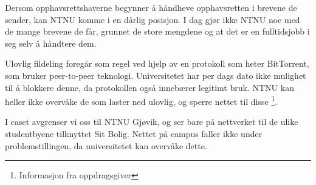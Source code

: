 Dersom opphavsrettshaverne begynner å håndheve opphavsretten i brevene de sender, kan NTNU komme i en dårlig posisjon. I dag gjør ikke NTNU noe med de mange brevene de får, grunnet de store mengdene og at det er en fulltidsjobb i seg selv å håndtere dem.

Ulovlig fildeling foregår som regel ved hjelp av en protokoll som heter BitTorrent, som bruker peer-to-peer teknologi. Universitetet har per dags dato ikke mulighet til å blokkere denne, da protokollen også innebærer legitimt bruk. NTNU kan heller ikke overvåke de som laster ned ulovlig, og sperre nettet til disse \footnote{Informasjon fra oppdragsgiver}.

I caset avgrenser vi oss til NTNU Gjøvik, og ser bare på nettverket til de ulike studentbyene tilknyttet Sit Bolig. Nettet på campus faller ikke under problemstillingen, da universitetet kan overvåke dette.